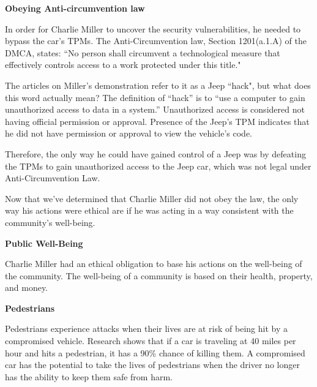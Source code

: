 \documentclass[12pt]{article}
\begin{document}
\begin{multicols}{2}
\textbf{Obeying Anti-circumvention law }\vspace{.2cm}

In order for Charlie Miller to uncover the security vulnerabilities, he needed to bypass the car's TPMs. \cite{brokeDMCA} The Anti-Circumvention law, Section 1201(a.1.A) of the DMCA, states: ``No person shall circumvent a technological measure that effectively controls access to a work protected under this title."\cite{DMCA}

The articles on Miller's demonstration refer to it as a Jeep ``hack", but what does this word actually mean? The definition of ``hack'' is to ``use a computer to gain unauthorized access to data in a system.''\cite{dictionary} Unauthorized access is considered not having official permission or approval. \cite{dictionary} Presence of the Jeep's TPM indicates that he did not have permission or approval to view the vehicle's code.

Therefore, the only way he could have gained control of a Jeep was by defeating the TPMs to gain unauthorized access to the Jeep car, which was not legal under Anti-Circumvention Law.\cite{DMCA}




Now that we've determined that Charlie Miller did not obey the law, the only way his actions were ethical are if he was acting in a way consistent with the community's well-being.

\vspace{.5cm}\hspace{-.5cm}\textbf{Public Well-Being}\vspace{.2cm}

Charlie Miller had an ethical obligation to base his actions on the well-being of the community. \cite{seCode} The well-being of a community is based on their health, property, and money.

\vspace{.2cm}\textbf{Pedestrians}

Pedestrians experience attacks when their lives are at risk of being hit by a compromised vehicle. Research shows that if a car is traveling at 40 miles per hour and hits a pedestrian, it has a 90\% chance of killing them.\cite{killSpeed} A compromised car has the potential to take the lives of pedestrians when the driver no longer has the ability to keep them safe from harm. 


\end{multicols}
\end{document}
